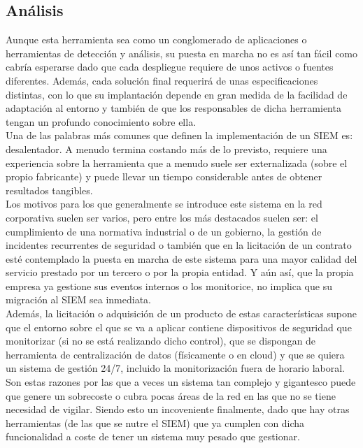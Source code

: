 \subsection{Análisis}

Aunque esta herramienta sea como un conglomerado de aplicaciones o herramientas de detección y análisis, su puesta en marcha no es así tan fácil como cabría esperarse dado que cada despliegue requiere de unos activos o fuentes diferentes. Además, cada solución final requerirá de unas especificaciones distintas, con lo que su implantación depende en gran medida de la facilidad de adaptación al entorno y también de que los responsables de dicha herramienta tengan un profundo conocimiento sobre ella.\\

Una de las palabras más comunes que definen la implementación de un SIEM es: desalentador. A menudo termina costando más de lo previsto, requiere una experiencia sobre la herramienta que a menudo suele ser externalizada (sobre el propio fabricante) y puede llevar un tiempo considerable antes de obtener resultados tangibles.\\

Los motivos para los que generalmente se introduce este sistema en la red corporativa suelen ser varios, pero entre los más destacados suelen ser: el cumplimiento de una normativa industrial o de un gobierno, la gestión de incidentes recurrentes de seguridad o también que en la licitación de un contrato esté contemplado la puesta en marcha de este sistema para una mayor calidad del servicio prestado por un tercero o por la propia entidad. Y aún así, que la propia empresa ya gestione sus eventos internos o los monitorice, no implica que su migración al SIEM sea inmediata.\\

Además, la licitación o adquisición de un producto de estas características supone que el entorno sobre el que se va a aplicar contiene dispositivos de seguridad que monitorizar (si no se está realizando dicho control), que se dispongan de herramienta de centralización de datos (físicamente o en cloud) y que se quiera un sistema de gestión 24/7, incluido la monitorización fuera de horario laboral.\\

Son estas razones por las que a veces un sistema tan complejo y gigantesco puede que genere un sobrecoste o cubra pocas áreas de la red en las que no se tiene necesidad de vigilar. Siendo esto un incoveniente finalmente, dado que hay otras herramientas (de las que se nutre el SIEM) que ya cumplen con dicha funcionalidad a coste de tener un sistema muy pesado que gestionar.\\

